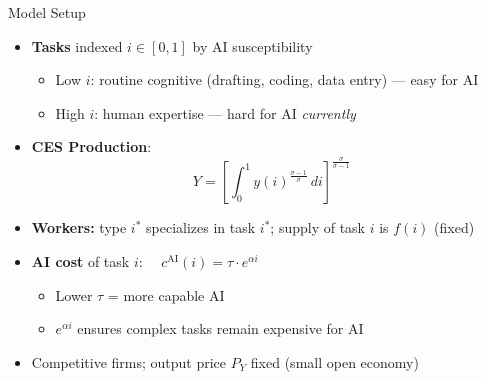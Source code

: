 \documentclass[aspectratio=169]{beamer}
\begin{document}
\begin{frame}{Model Setup}

\begin{itemize}
  \item \textbf{Tasks} indexed $i \in [0,1]$ by AI susceptibility
  \begin{itemize}
    \item Low $i$: routine cognitive (drafting, coding, data entry) --- easy for AI
    \item High $i$: human expertise --- hard for AI \textit{currently}
  \end{itemize}

  \medskip
  \item \textbf{CES Production}:
  \[
    Y = \left[\int_0^1 y(i)^{\frac{\sigma-1}{\sigma}}\,di\right]^{\!\frac{\sigma}{\sigma-1}}
  \]

  \medskip
  \item \textbf{Workers:} type $i^*$ specializes in task $i^*$; supply of task $i$ is $f(i)$ (fixed)

  \medskip
  \item \textbf{AI cost} of task $i$: $\quad c^{\mathrm{AI}}(i) = \tau\cdot e^{\alpha i}$
  \begin{itemize}
    \item Lower $\tau$ = more capable AI
    \item $e^{\alpha i}$ ensures complex tasks remain expensive for AI
  \end{itemize}

  \medskip
  \item Competitive firms; output price $P_Y$ fixed (small open economy)
\end{itemize}

\end{frame}
\end{document}
